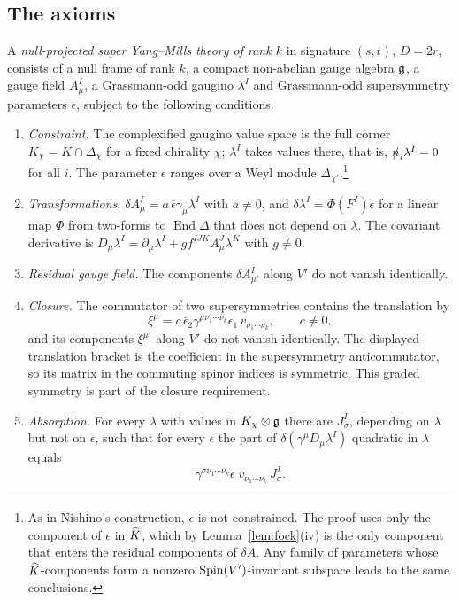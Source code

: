 \subsection{The axioms}

\begin{definition}
\label{def:npsym}
A \emph{null-projected super Yang--Mills theory of rank $k$} in signature $(s,t)$, $D=2r$, consists of a null frame of rank $k$, a compact non-abelian gauge algebra $\mathfrak{g}$, a gauge field $A^I_\mu$, a Grassmann-odd gaugino $\lambda^I$ and Grassmann-odd supersymmetry parameters $\epsilon$, subject to the following conditions.
\begin{enumerate}[label=(N\arabic*)]
\item\label{ax:N1} \emph{Constraint.} The complexified gaugino value space is the full corner $K_\chi=K\cap\Delta_\chi$ for a fixed chirality $\chi$; $\lambda^I$ takes values there, that is, $\slashed{n}_i\lambda^I=0$ for all $i$. The parameter $\epsilon$ ranges over a Weyl module $\Delta_{\chi'}$.\footnote{As in Nishino's construction, $\epsilon$ is not constrained. The proof uses only the component of $\epsilon$ in $\widehat{K}$, which by Lemma~\ref{lem:fock}(iv) is the only component that enters the residual components of $\delta A$. Any family of parameters whose $\widehat{K}$-components form a nonzero $\operatorname{Spin}(V')$-invariant subspace leads to the same conclusions.}
\item\label{ax:N2} \emph{Transformations.} $\delta A^I_\mu=a\,\bar\epsilon\gamma_\mu\lambda^I$ with $a\ne0$, and $\delta\lambda^I=\Phi(F^I)\epsilon$ for a linear map $\Phi$ from two-forms to $\operatorname{End}\Delta$ that does not depend on $\lambda$. The covariant derivative is $D_\mu\lambda^I=\partial_\mu\lambda^I+gf^{IJK}A^J_\mu\lambda^K$ with $g\ne0$.
\item\label{ax:N3} \emph{Residual gauge field.} The components $\delta A^I_{\mu'}$ along $V'$ do not vanish identically.
\item\label{ax:N4} \emph{Closure.} The commutator of two supersymmetries contains the translation by
\begin{equation}
\label{eq:xi}
\xi^\mu=c\,\bar\epsilon_2\gamma^{\mu\nu_1\cdots\nu_k}\epsilon_1\,v_{\nu_1\cdots\nu_k},\qquad c\ne0,
\end{equation}
and its components $\xi^{\mu'}$ along $V'$ do not vanish identically. The displayed translation bracket is the coefficient in the supersymmetry anticommutator, so its matrix in the commuting spinor indices is symmetric. This graded symmetry is part of the closure requirement.
\item\label{ax:N5} \emph{Absorption.} For every $\lambda$ with values in $K_\chi\otimes\mathfrak{g}$ there are $J^I_\sigma$, depending on $\lambda$ but not on $\epsilon$, such that for every $\epsilon$ the part of $\delta(\gamma^\mu D_\mu\lambda^I)$ quadratic in $\lambda$ equals
\begin{equation}
\label{eq:absorb}
\gamma^{\sigma\nu_1\cdots\nu_k}\epsilon\;v_{\nu_1\cdots\nu_k}\,J^I_\sigma .
\end{equation}
\end{enumerate}
\end{definition}

